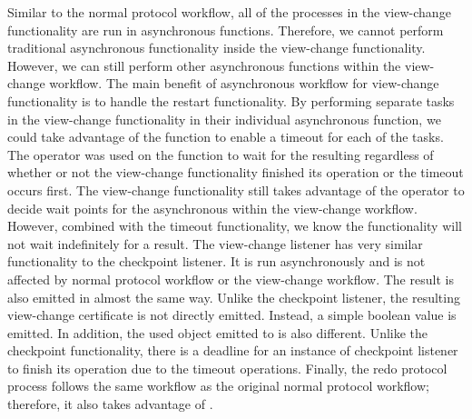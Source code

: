 Similar to the normal protocol workflow, all of the processes in the view-change functionality are run in  asynchronous functions. Therefore, we cannot perform traditional asynchronous functionality inside the view-change functionality. However, we can still perform other asynchronous  functions within the view-change workflow. 
The main benefit of asynchronous workflow for view-change functionality is to handle the restart functionality. By performing separate tasks in the view-change functionality in their individual asynchronous function, we could take advantage of the  function to enable a timeout for each of the tasks.  The  operator was used on the  function to wait for the resulting  regardless of whether or not the view-change functionality finished its operation or the timeout occurs first. The view-change functionality still takes advantage of the  operator to decide wait points for the asynchronous  within the view-change workflow. However, combined with the timeout functionality, we know the functionality will not wait indefinitely for a result. 
The view-change listener has very similar functionality to the checkpoint listener. It is run asynchronously and is not affected by normal protocol workflow or the view-change workflow. The result is also emitted in almost the same way. Unlike the checkpoint listener, the resulting view-change certificate is not directly emitted. Instead, a simple boolean value is emitted. In addition, the used  object emitted to is also different. Unlike the checkpoint functionality, there is a deadline for an instance of checkpoint listener to finish its operation due to the timeout operations. Finally, the redo protocol process follows the same workflow as the original normal protocol workflow; therefore, it also takes advantage of .

